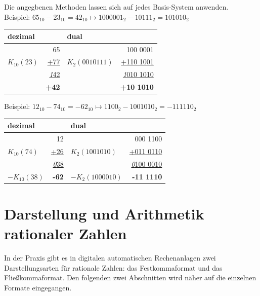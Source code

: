 \documentclass[11pt,a4paper]{scrreprt}
\begin{document}
Die angegbenen Methoden lassen sich auf jedes Basis-System anwenden. \\ Beispiel: $65_{10} - 23_{10} = 42_{10} \mapsto 1000001_2 - 10111_2 = 101010_2$ \\
\begin{center}
\begin{tabular}{lr|lr}
dezimal                           &      & dual             &                                 \\ \hline
                                  &  65  &                  &                       100 0001  \\
$K_{10}(23)$ &           \underline{+77} & $K_2(001 0111)$  &           \underline{+110 1001} \\
             & \underline{ \textit{1}42} &                  & \underline{ \textit{1}010 1010} \\
             &              \textbf{+42} &                  &               \textbf{+10 1010} \\
\end{tabular}
\end{center}
Beispiel: $12_{10} - 74_{10} = -62_{10} \mapsto 1100_2 - 100 1010_2 = -11 1110_2$
\begin{center}
\begin{tabular}{lr|lr}
dezimal       &                           & dual              &                                 \\ \hline
              &                       12  &                   &                       000 1100  \\
$K_{10}(74)$  &           \underline{+26} & $K_2(100 1010)$   &           \underline{+011 0110} \\
              & \underline{ \textit{0}38} &                   & \underline{ \textit{0}100 0010} \\
$-K_{10}(38)$ &              \textbf{-62} & $-K_2(100 0010)$  &               \textbf{-11 1110} \\
\end{tabular}
\end{center}


\section{Darstellung und Arithmetik rationaler Zahlen}
In der Praxis gibt es in digitalen automatischen Rechenanlagen zwei Darstellungsarten für rationale Zahlen: das Festkommaformat und das Fließkommaformat. Den folgenden zwei Abschnitten wird näher auf die einzelnen Formate eingegangen.
\end{document}
